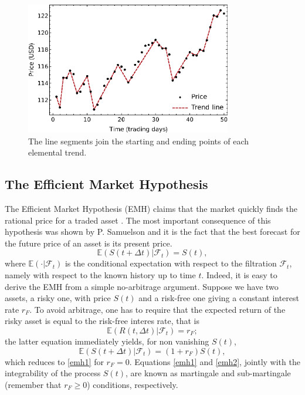 \documentclass[a4paper]{jpconf}
\begin{document}
\begin{figure}
\begin{center}
\includegraphics[width=9cm]{img/TrendReturnsVisual.eps}
\end{center}
\caption{\label{fig:trends}The line segments join the starting and ending points of each elemental trend.}
\end{figure}


\subsection{The Efficient Market Hypothesis}
\label{efficient}
The Efficient Market Hypothesis (EMH) claims that the market quickly finds the rational price for a traded asset \cite{Mantegna}. The most important consequence of this hypothesis was shown by P. Samuelson \cite{Samuelson 2} and it is the fact that the best forecast for the future price of an asset is its present price.
\begin{equation}
\label{emh1}
\mathbb{E}(S(t+\Delta t)|\mathcal{F}_t ) = S(t),
\end{equation} 
where $\mathbb{E}(\cdot|\mathcal{F}_t)$ is the conditional expectation with respect to the filtration $\mathcal{F}_t$, namely with respect to the known history up to time $t$. Indeed, it is easy to derive the EMH from a simple no-arbitrage argument. Suppose we have two assets, a risky one, with price $S(t)$ and a risk-free one giving a constant interest rate $r_F$. To avoid arbitrage, one has to require that the expected return of the risky asset is equal to the risk-free interes rate, that is
\begin{equation}
\mathbb{E} (R(t, \Delta t)|\mathcal{F}_t) = r_F;
\end{equation}
the latter equation immediately yields, for non vanishing $S(t)$,
\begin{equation}
\label{emh2}
\mathbb{E}(S(t+\Delta t)|\mathcal{F}_t ) = (1+r_F) S(t),
\end{equation}
which reduces to \eqref{emh1} for $r_F = 0$. Equations \eqref{emh1} and
\eqref{emh2}, jointly with the integrability of the process $S(t)$, are known as martingale and sub-martingale (remember that $r_F \geq 0$) conditions, respectively.
\end{document}
